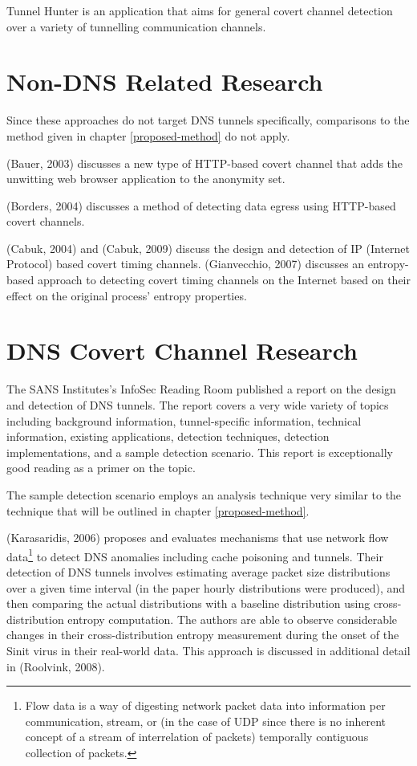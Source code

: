 \documentclass[12pt]{report}
\theoremstyle{remark}
\theoremstyle{definition}
\theoremstyle{definition}
\theoremstyle{definition}
\begin{document}
Tunnel Hunter\cite{Dusi2009} is an application that aims for general covert
channel detection over a variety of tunnelling communication channels.

\section{Non-DNS Related Research} Since these approaches do not target DNS
tunnels specifically, comparisons to the method given in chapter
\ref{proposed-method} do not apply.

(Bauer, 2003)\cite{Bauer2003} discusses a new type of HTTP-based covert channel
that adds the unwitting web browser application to the anonymity set.

(Borders, 2004)\cite{Borders2004} discusses a method of detecting data egress
using HTTP-based covert channels.

(Cabuk, 2004)\cite{Cabuk2004} and (Cabuk, 2009)\cite{Cabuk2009} discuss the
design and detection of IP (Internet Protocol) based covert timing channels.
(Gianvecchio, 2007)\cite{Gianvecchio2007} discusses an entropy-based approach to
detecting covert timing channels on the Internet based on their effect on the
original process' entropy properties.

\section{DNS Covert Channel Research}
\label{litreview-dns}
The SANS
Institutes's InfoSec Reading Room published a report on the design and detection
of DNS tunnels\cite{SANS2013}. The report covers a very wide variety of topics
including background information, tunnel-specific information, technical
information, existing applications, detection techniques, detection
implementations, and a sample detection scenario. This report is exceptionally
good reading as a primer on the topic.

The sample detection scenario employs an analysis technique very similar to the
technique that will be outlined in chapter \ref{proposed-method}.

(Karasaridis, 2006)\cite{Karasaridis2006} proposes and evaluates mechanisms that
use network flow data\footnote{Flow data is a way of digesting network packet
data into information per communication, stream, or (in the case of UDP since
there is no inherent concept of a stream of interrelation of packets) temporally
contiguous collection of packets.} to detect DNS anomalies including cache
poisoning and tunnels. Their detection of DNS tunnels involves estimating
average packet size distributions over a given time interval (in the paper
hourly distributions were produced), and then comparing the actual distributions
with a baseline distribution using cross-distribution entropy computation. The
authors are able to observe considerable changes in their cross-distribution
entropy measurement during the onset of the Sinit virus in their real-world
data. This approach is discussed in additional detail in (Roolvink,
2008)\cite{Roolvink2008}.
\end{document}
